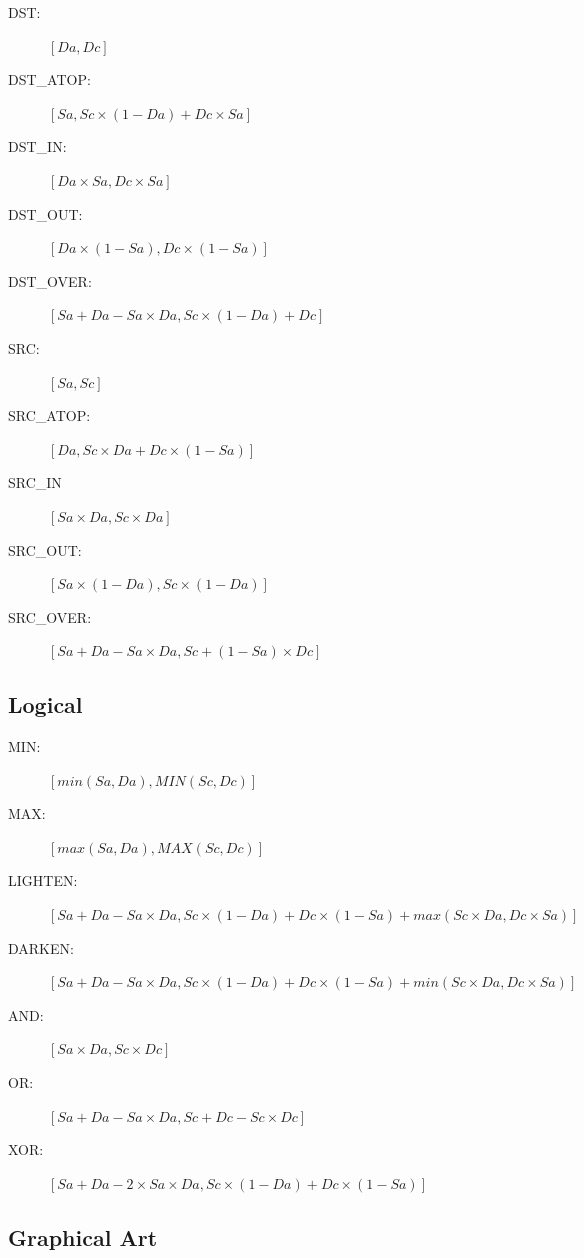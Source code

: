 \begin{description}
    \item[DST:] $[Da, Dc]$
    \item[DST\_ATOP:] $[Sa, Sc \times (1 - Da) + Dc \times Sa]$
    \item[DST\_IN:] $[Da \times Sa, Dc \times Sa]$
    \item[DST\_OUT:] $[Da \times (1 - Sa), Dc \times (1 - Sa)]$
    \item[DST\_OVER:] $[Sa + Da - Sa \times Da, Sc \times (1 - Da) + Dc]$
    \item[SRC:] $[Sa, Sc]$
    \item[SRC\_ATOP:] $[Da, Sc \times Da + Dc \times (1 - Sa)]$
    \item[SRC\_IN] $[Sa \times Da, Sc \times Da]$
    \item[SRC\_OUT:] $[Sa \times (1 - Da), Sc \times (1 - Da)]$
    \item[SRC\_OVER:] $[Sa + Da - Sa \times Da, Sc + (1 - Sa) \times Dc]$   
\end{description}

\subsection*{Logical}%
\label{sub:logical}

\begin{description}
    \item[MIN:] $[min(Sa, Da), MIN(Sc, Dc)]$
    \item[MAX:] $[max(Sa, Da), MAX(Sc, Dc)]$
    \item[LIGHTEN:] $[Sa + Da - Sa \times Da, Sc \times (1 - Da) + Dc \times (1 - Sa) + max(Sc \times Da, Dc \times Sa)]$
    \item[DARKEN:] $[Sa + Da - Sa \times Da, Sc \times (1 - Da) + Dc \times (1 - Sa) + min(Sc \times Da, Dc \times Sa)]$
    \item[AND:] $[Sa \times Da, Sc \times Dc]$
    \item[OR:] $[Sa + Da - Sa \times Da, Sc + Dc - Sc \times Dc]$
    \item[XOR:] $[Sa + Da - 2 \times Sa \times Da, Sc \times (1 - Da) + Dc \times (1 - Sa)]$
\end{description}

\subsection*{Graphical Art}%
\label{sub:graphical_art}

